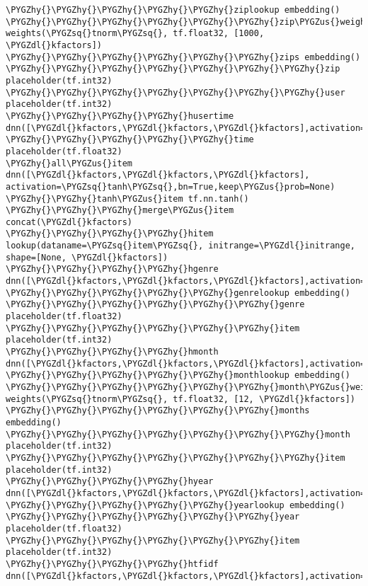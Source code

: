 \documentclass[letterpaper,10pt,english]{sphinxmanual}
\def\PYGZus{\char`\_}
\def\PYGZdl{\char`\$}
\def\PYGZhy{\char`\-}
\def\PYGZsq{\char`\'}
\renewcommand\PYGZsq{\textquotesingle}
\begin{document}
\begin{Verbatim}[commandchars=\\\{\}]
\PYGZhy{}\PYGZhy{}\PYGZhy{}\PYGZhy{}\PYGZhy{}ziplookup embedding()
\PYGZhy{}\PYGZhy{}\PYGZhy{}\PYGZhy{}\PYGZhy{}\PYGZhy{}zip\PYGZus{}weights weights(\PYGZsq{}tnorm\PYGZsq{}, tf.float32, [1000, \PYGZdl{}kfactors])
\PYGZhy{}\PYGZhy{}\PYGZhy{}\PYGZhy{}\PYGZhy{}\PYGZhy{}zips embedding()
\PYGZhy{}\PYGZhy{}\PYGZhy{}\PYGZhy{}\PYGZhy{}\PYGZhy{}\PYGZhy{}zip placeholder(tf.int32)
\PYGZhy{}\PYGZhy{}\PYGZhy{}\PYGZhy{}\PYGZhy{}\PYGZhy{}\PYGZhy{}user placeholder(tf.int32)
\PYGZhy{}\PYGZhy{}\PYGZhy{}\PYGZhy{}husertime dnn([\PYGZdl{}kfactors,\PYGZdl{}kfactors,\PYGZdl{}kfactors],activation=\PYGZsq{}tanh\PYGZsq{},bn=True,keep\PYGZus{}prob=None)
\PYGZhy{}\PYGZhy{}\PYGZhy{}\PYGZhy{}\PYGZhy{}time placeholder(tf.float32)
\PYGZhy{}all\PYGZus{}item dnn([\PYGZdl{}kfactors,\PYGZdl{}kfactors,\PYGZdl{}kfactors], activation=\PYGZsq{}tanh\PYGZsq{},bn=True,keep\PYGZus{}prob=None)
\PYGZhy{}\PYGZhy{}tanh\PYGZus{}item tf.nn.tanh()
\PYGZhy{}\PYGZhy{}\PYGZhy{}merge\PYGZus{}item concat(\PYGZdl{}kfactors)
\PYGZhy{}\PYGZhy{}\PYGZhy{}\PYGZhy{}hitem lookup(dataname=\PYGZsq{}item\PYGZsq{}, initrange=\PYGZdl{}initrange, shape=[None, \PYGZdl{}kfactors])
\PYGZhy{}\PYGZhy{}\PYGZhy{}\PYGZhy{}hgenre dnn([\PYGZdl{}kfactors,\PYGZdl{}kfactors,\PYGZdl{}kfactors],activation=\PYGZsq{}tanh\PYGZsq{},bn=True,keep\PYGZus{}prob=None)
\PYGZhy{}\PYGZhy{}\PYGZhy{}\PYGZhy{}\PYGZhy{}genrelookup embedding()
\PYGZhy{}\PYGZhy{}\PYGZhy{}\PYGZhy{}\PYGZhy{}\PYGZhy{}genre placeholder(tf.float32)
\PYGZhy{}\PYGZhy{}\PYGZhy{}\PYGZhy{}\PYGZhy{}\PYGZhy{}item placeholder(tf.int32)
\PYGZhy{}\PYGZhy{}\PYGZhy{}\PYGZhy{}hmonth dnn([\PYGZdl{}kfactors,\PYGZdl{}kfactors,\PYGZdl{}kfactors],activation=\PYGZsq{}tanh\PYGZsq{},bn=True,keep\PYGZus{}prob=None)
\PYGZhy{}\PYGZhy{}\PYGZhy{}\PYGZhy{}\PYGZhy{}monthlookup embedding()
\PYGZhy{}\PYGZhy{}\PYGZhy{}\PYGZhy{}\PYGZhy{}\PYGZhy{}month\PYGZus{}weights weights(\PYGZsq{}tnorm\PYGZsq{}, tf.float32, [12, \PYGZdl{}kfactors])
\PYGZhy{}\PYGZhy{}\PYGZhy{}\PYGZhy{}\PYGZhy{}\PYGZhy{}months embedding()
\PYGZhy{}\PYGZhy{}\PYGZhy{}\PYGZhy{}\PYGZhy{}\PYGZhy{}\PYGZhy{}month placeholder(tf.int32)
\PYGZhy{}\PYGZhy{}\PYGZhy{}\PYGZhy{}\PYGZhy{}\PYGZhy{}\PYGZhy{}item placeholder(tf.int32)
\PYGZhy{}\PYGZhy{}\PYGZhy{}\PYGZhy{}hyear dnn([\PYGZdl{}kfactors,\PYGZdl{}kfactors,\PYGZdl{}kfactors],activation=\PYGZsq{}tanh\PYGZsq{},bn=True,keep\PYGZus{}prob=None)
\PYGZhy{}\PYGZhy{}\PYGZhy{}\PYGZhy{}\PYGZhy{}yearlookup embedding()
\PYGZhy{}\PYGZhy{}\PYGZhy{}\PYGZhy{}\PYGZhy{}\PYGZhy{}year placeholder(tf.float32)
\PYGZhy{}\PYGZhy{}\PYGZhy{}\PYGZhy{}\PYGZhy{}\PYGZhy{}item placeholder(tf.int32)
\PYGZhy{}\PYGZhy{}\PYGZhy{}\PYGZhy{}htfidf dnn([\PYGZdl{}kfactors,\PYGZdl{}kfactors,\PYGZdl{}kfactors],activation=\PYGZsq{}tanh\PYGZsq{},bn=True,keep\PYGZus{}prob=None)

\end{Verbatim}
\end{document}
